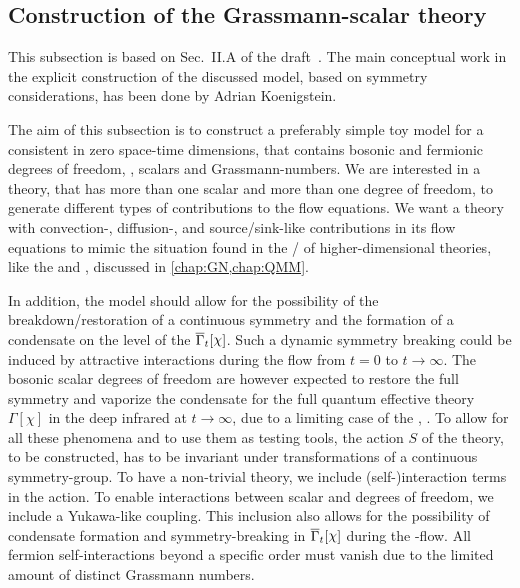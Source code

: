 \subsection{Construction of the  Grassmann-scalar theory}\label{subsec:0dSU2model}
\begin{disclaimer}
	This subsection is based on Sec.~II.A of the draft~\cite{Steil:partIV}.
	The main conceptual work in the explicit construction of the discussed model, based on symmetry considerations, has been done by Adrian Koenigstein.
\end{disclaimer}
\vspace{-.1em}
The aim of this subsection is to construct a preferably simple toy model for a consistent \qft{} in zero space-time dimensions, that contains bosonic and fermionic degrees of freedom, \ie{}, scalars and Grassmann-numbers.
We are interested in a theory, that has more than one scalar and more than one \gmv{} degree of freedom, to generate different types of contributions to the \frg{} flow equations.
We want a theory with convection-, diffusion-, and source/sink-like contributions in its \frg{} flow equations to mimic the situation found in the \lpa{}/\de{} of higher-dimensional theories, like the \gnm{} and \qmm{}, discussed in \cref{chap:GN,chap:QMM}.\clearpage

In addition, the model should allow for the possibility of the breakdown/restoration of a continuous symmetry and the formation of a condensate on the level of the \eaa{} $\FSeaa_t[\chi]$.
Such a dynamic symmetry breaking could be induced by attractive \gmv{} interactions during the \frg{} flow from $t = 0$ to $t \rightarrow \infty$.
The bosonic scalar degrees of freedom are however expected to restore the full symmetry and vaporize the condensate for the full quantum effective theory $\Gamma[\chi]$ in the deep infrared at $t \rightarrow \infty$, due to a limiting case of the \cmwhTheoremWithRefs{}, \cf{} \MWApp.
To allow for all these phenomena and to use them as testing tools, the action $S$ of the theory, to be constructed, has to be invariant under transformations of a continuous symmetry-group. 
To have a non-trivial  theory, we include (self-)interaction terms in the action.
To enable interactions between scalar and \gmv{} degrees of freedom, we include a Yukawa-like coupling.
This inclusion also allows for the possibility of condensate formation and symmetry-breaking in $\FSeaa_t[\chi]$ during the \rg{}-flow.
All fermion self-interactions beyond a specific order must vanish due to the limited amount of distinct Grassmann numbers.

